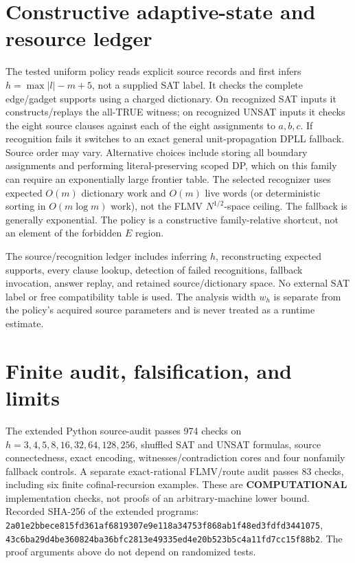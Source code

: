 \documentclass[11pt]{article}
\begin{document}
\section{Constructive adaptive-state and resource ledger}
The tested uniform policy reads explicit source records and first infers \(h=\max|l|-m+5\), not a supplied SAT label. It checks the complete edge/gadget supports using a charged dictionary. On recognized SAT inputs it constructs/replays the all-TRUE witness; on recognized UNSAT inputs it checks the eight source clauses against each of the eight assignments to \(a,b,c\). If recognition fails it switches to an exact general unit-propagation DPLL fallback. Source order may vary. Alternative choices include storing all boundary assignments and performing literal-preserving scoped DP, which on this family can require an exponentially large frontier table. The selected recognizer uses expected \(O(m)\) dictionary work and \(O(m)\) live words (or deterministic sorting in \(O(m\log m)\) work), not the FLMV \(N^{1/2}\)-space ceiling. The fallback is generally exponential. The policy is a constructive family-relative shortcut, not an element of the forbidden \(E\) region.

The source/recognition ledger includes inferring \(h\), reconstructing expected supports, every clause lookup, detection of failed recognitions, fallback invocation, answer replay, and retained source/dictionary space. No external SAT label or free compatibility table is used. The analysis width \(w_h\) is separate from the policy's acquired source parameters and is never treated as a runtime estimate.

\section{Finite audit, falsification, and limits}
The extended Python source-audit passes 974 checks on \(h=3,4,5,8,16,32,64,128,256\), shuffled SAT and UNSAT formulas, source connectedness, exact encoding, witnesses/contradiction cores and four nonfamily fallback controls. A separate exact-rational FLMV/route audit passes 83 checks, including six finite cofinal-recursion examples. These are \textbf{COMPUTATIONAL} implementation checks, not proofs of an arbitrary-machine lower bound. Recorded SHA-256 of the extended programs: \texttt{2a01e2bbece815fd361af6819307e9e118a34753f868ab1f48ed3fdfd3441075}, \texttt{43c6ba29d4be360824ba36bfc2813e49335ed4e20b523b5c4a11fd7cc15f88b2}. The proof arguments above do not depend on randomized tests.
\end{document}
